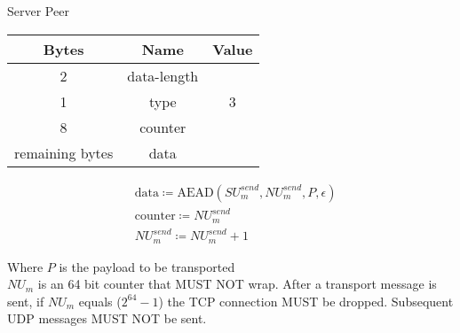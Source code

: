 \begin{center}
    Server \textrightarrow Peer\\
    \begin{tabular}{|c|c|c|}
        \hline
        \textbf{Bytes}  & \textbf{Name} & \textbf{Value} \\
        \hline
        2               & data-length   &                \\
        \hline
        1               & type          & 3              \\
        \hline
        8               & counter       &                \\
        \hline
        remaining bytes & data          &                \\
        \hline
    \end{tabular}
\end{center}


\begin{align*}
    & \text{data} \coloneqq \text{AEAD}(\mathit{SU}_{m}^{send}, \mathit{NU}_{m}^{send}, P, \epsilon)\\
    & \text{counter} \coloneqq \mathit{NU}_{m}^{send}\\
    & \mathit{NU}_{m}^{send} \coloneqq \mathit{NU}_{m}^{send} + 1
\end{align*}


Where $P$ is the payload to be transported\\

$\mathit{NU}_{m}$ is an 64 bit counter that MUST NOT wrap. After a transport message is sent, if $\mathit{NU}_{m}$ equals
($2^{64}-1$) the TCP connection MUST be dropped. Subsequent UDP messages MUST NOT be sent. \\

